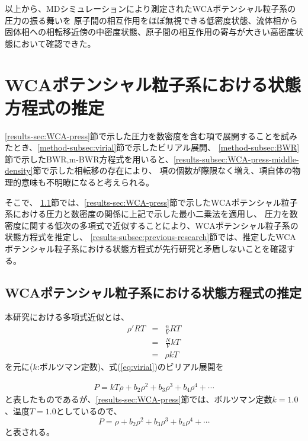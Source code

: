 \documentclass[titlepage]{jsreport}
\begin{document}
{{{以上から、MDシミュレーションにより測定されたWCAポテンシャル粒子系の圧力の振る舞いを
原子間の相互作用をほぼ無視できる低密度状態、流体相から固体相への相転移近傍の中密度状態、原子間の相互作用の寄与が大きい高密度状態において確認できた。

\newpage
\section{WCAポテンシャル粒子系における状態方程式の推定}\label{results-sec:WCA-equation}
\ref{results-sec:WCA-press}節で示した圧力を数密度を含む項で展開することを試みたとき、\ref{method-subsec:virial}節で示したビリアル展開、
\ref{method-subsec:BWR}節で示したBWR,m-BWR方程式を用いると、\ref{results-subsec:WCA-press-middle-density}節で示した相転移の存在により、
項の個数が際限なく増え、項自体の物理的意味も不明瞭になると考えられる。

そこで、
\ref{results-subsec:WCA-equation}節では、\ref{results-sec:WCA-press}節で示したWCAポテンシャル粒子系における圧力と数密度の関係に上記で示した最小二乗法を適用し、
圧力を数密度に関する低次の多項式で近似することにより、WCAポテンシャル粒子系の状態方程式を推定し、
\ref{results-subsec:previous-research}節では、推定したWCAポテンシャル粒子系における状態方程式が先行研究と矛盾しないことを確認する。


\subsection{WCAポテンシャル粒子系における状態方程式の推定}\label{results-subsec:WCA-equation}
本研究における多項式近似とは、
\large
\begin{eqnarray}
    {{\rho}'}RT \nonumber &=& \frac{n}{V}RT \nonumber \\ 
    &=& \frac{N}{V}kT \nonumber \\ 
    &=& {\rho}kT \nonumber
\end{eqnarray}
\normalsize
を元に($k$:ボルツマン定数)、式(\ref{eq:virial})のビリアル展開を

\large
\begin{eqnarray}
    P=kT\rho+b_2\rho^2+b_3\rho^3+b_4\rho^4+\cdots\label{eq:search-virial} \nonumber
\end{eqnarray}
\normalsize
と表したものであるが、\ref{results-sec:WCA-press}節では、ボルツマン定数$k=1.0$、温度$T=1.0$としているので、
\large
\begin{equation}
    P=\rho+b_2\rho^2+b_3\rho^3+b_4\rho^4+\cdots\label{eq:modified-search-virial}
\end{equation}
\normalsize
と表される。

}}}
\end{document}
